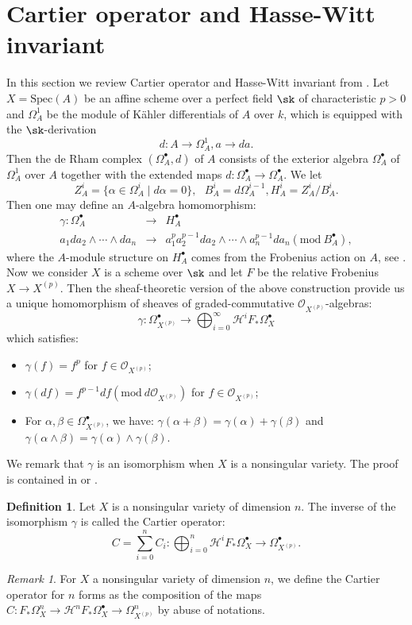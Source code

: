 \documentclass[11pt,leqno]{article}
\theoremstyle{remark}
\newtheorem{rem}{Remark}
\theoremstyle{definition}
\newtheorem{defi}{Definition}
\begin{document}
\section{Cartier operator and Hasse-Witt invariant}
\label{27112025bimsa}
In this section we review Cartier operator and Hasse-Witt invariant from \cite{BK05}.
Let $X = \mathrm{Spec}(A)$ be an affine scheme over a perfect field $\sk$ of characteristic $p >0$ and $\Omega_A^1$ be the module of K\"{a}hler differentials of $A$ over $k$, which is equipped with the $\sk$-derivation
\[
d: A \to \Omega^1_A, a \to da.
\]
Then the de Rham complex $(\Omega_A^{\bullet}, d)$ of $A$ consists of the exterior algebra $\Omega_A^{\bullet}$ of $\Omega_A^1$ over $A$ together with the extended maps $d: \Omega^{\bullet}_A \to \Omega^{\bullet}_A$. 
We let
\[
Z^i_A = \{\alpha \in \Omega_A^i \mid d\alpha = 0\},  \ \ \ B^i_A = d \Omega_A^{i-1}, H_A^i = Z^i_A/B^i_A.
\]
Then one may define an $A$-algebra homomorphism:
\begin{eqnarray*} \nonumber
    \gamma: \Omega^{\bullet}_A &\to& H^{\bullet}_A \\
    a_1da_2 \wedge \cdots\wedge da_n &\to& a_1^p a_2^{p-1}da_2 \wedge \cdots \wedge a_n^{p-1} da_n (\mathrm{mod}\ B_A^{\bullet}), 
\end{eqnarray*}
where the $A$-module structure on $H^{\bullet}_A$ comes from the Frobenius action on $A$, see \cite[Lemma 1.3.3]{BK05}. Now we consider $X$ is a scheme over $\sk$ and let $F$ be the relative Frobenius $X \to X^{(p)}$. Then the sheaf-theoretic version of the above construction provide us a unique homomorphism of sheaves of graded-commutative $\mathcal{O}_{X^{(p)}}$-algebras:
\[
\gamma: \Omega^{\bullet}_{X^{(p)}} \to \bigoplus^{\infty}_{i=0} \mathcal{H}^i F_{*} \Omega_X^{\bullet}
\]
which satisfies:
\begin{itemize}
    \item 
    $\gamma(f) = f^p$ for $f \in \mathcal{O}_{X^{(p)}}$;
    \item 
    $\gamma(df) = f^{p-1}df(\mathrm{mod} \ d\mathcal{O}_{X^{(p)}})$ for $f \in \mathcal{O}_{X^{(p)}}$;
    \item 
    For $\alpha, \beta \in \Omega^{\bullet}_{X^{(p)}}$, we have: $\gamma(\alpha + \beta) = \gamma(\alpha) + \gamma(\beta)$ and
    $\gamma(\alpha \wedge \beta) = \gamma(\alpha) \wedge \gamma(\beta)$.
\end{itemize}
We remark that $\gamma$ is an isomorphism when $X$ is a nonsingular variety. The proof is contained in \cite[Theorem 2.1.1]{Katz1972} or \cite[Theorem 1.3.4]{BK05}.
\begin{defi}
Let $X$ is a nonsingular variety of dimension $n$. The inverse of the isomorphism $\gamma$ is called the Cartier operator:
\[
C = \sum^n_{i=0} C_i: \bigoplus^{n}_{i=0} \mathcal{H}^i F_{*} \Omega_X^{\bullet} \to \Omega^{\bullet}_{X^{(p)}}.
\]
\end{defi}
\begin{rem}
For $X$ a nonsingular variety of dimension $n$, we define the Cartier operator for $n$ forms as the composition of the maps $C: F_* \Omega_X^n \to \mathcal{H}^n F_{*} \Omega_X^{\bullet} \to \Omega^{n}_{X^{(p)}}$ by abuse of notations.
\end{rem}
\end{document}
